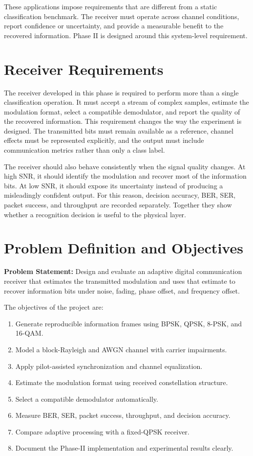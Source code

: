 \documentclass[12pt,twoside,openright]{report}
\begin{document}
These applications impose requirements that are different from a static
classification benchmark. The receiver must operate across channel
conditions, report confidence or uncertainty, and provide a measurable
benefit to the recovered information. Phase II is designed around this
system-level requirement.

\section{Receiver Requirements}
The receiver developed in this phase is required to perform more than a
single classification operation. It must accept a stream of complex samples,
estimate the modulation format, select a compatible demodulator, and report
the quality of the recovered information. This requirement changes the way
the experiment is designed. The transmitted bits must remain available as a
reference, channel effects must be represented explicitly, and the output
must include communication metrics rather than only a class label.

The receiver should also behave consistently when the signal quality changes.
At high SNR, it should identify the modulation and recover most of the
information bits. At low SNR, it should expose its uncertainty instead of
producing a misleadingly confident output. For this reason, decision
accuracy, BER, SER, packet success, and throughput are recorded separately.
Together they show whether a recognition decision is useful to the physical
layer.

\section{Problem Definition and Objectives}
\textbf{Problem Statement:} Design and evaluate an adaptive digital
communication receiver that estimates the transmitted modulation and uses
that estimate to recover information bits under noise, fading, phase offset,
and frequency offset.

The objectives of the project are:
\begin{enumerate}
\item Generate reproducible information frames using BPSK, QPSK, 8-PSK, and
      16-QAM.
\item Model a block-Rayleigh and AWGN channel with carrier impairments.
\item Apply pilot-assisted synchronization and channel equalization.
\item Estimate the modulation format using received constellation structure.
\item Select a compatible demodulator automatically.
\item Measure BER, SER, packet success, throughput, and decision accuracy.
\item Compare adaptive processing with a fixed-QPSK receiver.
\item Document the Phase-II implementation and experimental results clearly.
\end{enumerate}
\end{document}
